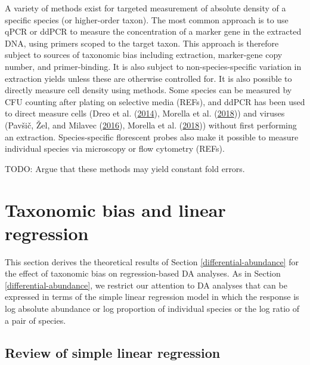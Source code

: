 \documentclass[
]{article}
\begin{document}
A variety of methods exist for targeted measurement of absolute density of a specific species (or higher-order taxon).
The most common approach is to use qPCR or ddPCR to measure the concentration of a marker gene in the extracted DNA, using primers scoped to the target taxon.
This approach is therefore subject to sources of taxonomic bias including extraction, marker-gene copy number, and primer-binding.
It is also subject to non-species-specific variation in extraction yields unless these are otherwise controlled for.
It is also possible to directly measure cell density using methods.
Some species can be measured by CFU counting after plating on selective media (REFs), and ddPCR has been used to direct measure cells (Dreo et al. (\protect\hyperlink{ref-dreo2014opti}{2014}), Morella et al. (\protect\hyperlink{ref-morella2018rapi}{2018})) and viruses (Pavšič, Žel, and Milavec (\protect\hyperlink{ref-pavsic2016digi}{2016}), Morella et al. (\protect\hyperlink{ref-morella2018rapi}{2018})) without first performing an extraction.
Species-specific florescent probes also make it possible to measure individual species via microscopy or flow cytometry (REFs).

TODO: Argue that these methods may yield constant fold errors.

\hypertarget{appendix-regression}{%
\section{Taxonomic bias and linear regression}\label{appendix-regression}}

This section derives the theoretical results of Section \ref{differential-abundance} for the effect of taxonomic bias on regression-based DA analyses.
As in Section \ref{differential-abundance}, we restrict our attention to DA analyses that can be expressed in terms of the simple linear regression model in which the response is log absolute abundance or log proportion of individual species or the log ratio of a pair of species.

\hypertarget{review-of-simple-linear-regression}{%
\subsection{Review of simple linear regression}\label{review-of-simple-linear-regression}}
\end{document}
